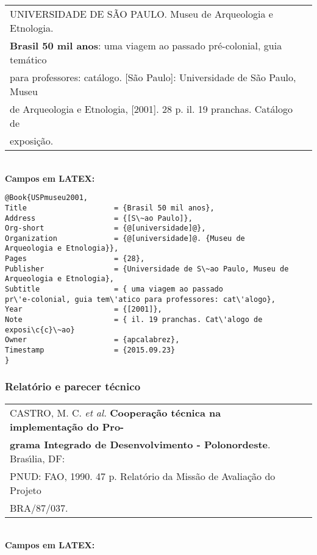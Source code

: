 \begin{tabular}{|l|c|} \hline
	UNIVERSIDADE DE S\~AO PAULO. Museu de Arqueologia e Etnologia.  \\ \textbf{Brasil 50 mil anos}: uma viagem ao passado pr\'e-colonial, guia tem\'atico \\ para professores: cat\'alogo. [S\~ao Paulo]: Universidade de S\~ao Paulo, Museu \\ de
	Arqueologia e Etnologia, [2001]. 28 p. il. 19 pranchas. Cat\'alogo de \\ exposi\c{c}\~ao.   \\\hline
\end{tabular}\\

\textbf{Campos em LATEX:}

\begin{verbatim}
@Book{USPmuseu2001,
Title                    = {Brasil 50 mil anos},
Address                  = {[S\~ao Paulo]},
Org-short                = {@[universidade]@},
Organization             = {@[universidade]@. {Museu de 
Arqueologia e Etnologia}},
Pages                    = {28},
Publisher                = {Universidade de S\~ao Paulo, Museu de 
Arqueologia e Etnologia},
Subtitle                 = { uma viagem ao passado
pr\'e-colonial, guia tem\'atico para professores: cat\'alogo},
Year                     = {[2001]},
Note                     = { il. 19 pranchas. Cat\'alogo de exposi\c{c}\~ao}
Owner                    = {apcalabrez},
Timestamp                = {2015.09.23}
}
\end{verbatim}

\subsubsection{Relat\'orio e parecer t\'ecnico}

\begin{tabular}{|l|c|} \hline
	CASTRO, M. C. \textit{et al.} \textbf{Coopera\c{c}\~ao t\'ecnica na implementa\c{c}\~ao do
		Pro-}\\\textbf{grama Integrado de Desenvolvimento - Polonordeste}. Bras\'{\i}lia, DF: \\ PNUD: FAO, 1990. 47 p. Relat\'orio da Miss\~ao de Avalia\c{c}\~ao do Projeto \\ BRA/87/037.     \\\hline
\end{tabular}\\

\textbf{Campos em LATEX:}

